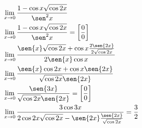 \begin{ex}
\begin{align}
&\lim_{x\rightarrow 0} \frac{1-\cos{x}\sqrt{\cos{2x}}}{\sen^2{x}}\nonumber\\
&\lim_{x\rightarrow 0} \frac{1-\cos{x}\sqrt{\cos{2x}}}{\sen^2{x}}=\left[\frac{0}{0}\right]\nonumber\\
&\lim_{x\rightarrow 0} \frac{\sen{x}\sqrt{\cos{2x}}+\cos{x}\frac{2\sen{2x}}{2\sqrt{\cos{2x}}}}{2\sen{x}\cos{x}}\nonumber\\
&\lim_{x\rightarrow 0} \frac{\sen{x}\cos{2x}+\cos{x}\sen{2x}}{\sqrt{\cos{2x}}\sen{2x}}\nonumber\\
&\lim_{x\rightarrow 0} \frac{\sen{3x}}{\sqrt{\cos{2x}}\sen{2x}}=\left[\frac{0}{0}\right]\nonumber\\
&\lim_{x\rightarrow 0} \frac{3\cos{3x}}{2\cos{2x}\sqrt{\cos{2x}}-\sen{2x}\frac{\sen{2x}}{\sqrt{\cos{2x}}}}=\frac{3}{2}\nonumber
\end{align}
\end{ex}